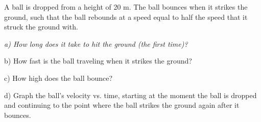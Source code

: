 \documentclass[12pt]{article}
\begin{document}
        \Large \centerline{}
        \normalsize
        \rm

A ball is dropped from a height of 20 m. The ball bounces when it strikes the ground, such
that the ball rebounds at a speed equal to half the speed that it struck the ground with.

\it
a) How long does it take to hit the ground (the first time)?

\vspace{1.5in}

b) How fast is the ball traveling when it strikes the ground?
\vspace{1.5in}

c) How high does the ball bounce?
\vspace{1.5in}

d) Graph the ball's velocity vs. time, starting at the moment the ball is dropped
and continuing to the point where the ball strikes the ground again after it bounces.
\end{document}
